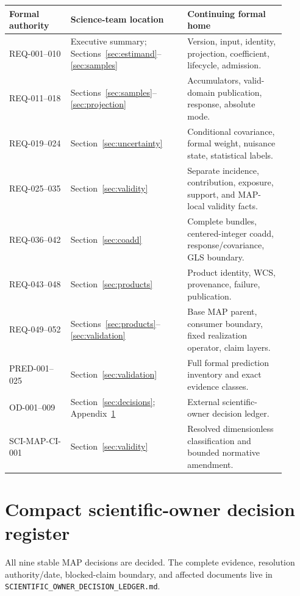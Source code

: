 \documentclass[10pt]{article}
\newcommand{\code}[1]{\nolinkurl{#1}}
\begin{document}
\begin{longtable}{L{0.20\linewidth}L{0.38\linewidth}L{0.32\linewidth}}
\toprule Formal authority & Science-team location & Continuing formal home \\
\midrule
REQ-001--010 & Executive summary; Sections~\ref{sec:estimand}--\ref{sec:samples} & Version, input, identity, projection, coefficient, lifecycle, admission.\\
REQ-011--018 & Sections~\ref{sec:samples}--\ref{sec:projection} & Accumulators, valid-domain publication, response, absolute mode.\\
REQ-019--024 & Section~\ref{sec:uncertainty} & Conditional covariance, formal weight, nuisance state, statistical labels.\\
REQ-025--035 & Section~\ref{sec:validity} & Separate incidence, contribution, exposure, support, and MAP-local validity facts.\\
REQ-036--042 & Section~\ref{sec:coadd} & Complete bundles, centered-integer coadd, response/covariance, GLS boundary.\\
REQ-043--048 & Section~\ref{sec:products} & Product identity, WCS, provenance, failure, publication.\\
REQ-049--052 & Sections~\ref{sec:products}--\ref{sec:validation} & Base MAP parent, consumer boundary, fixed realization operator, claim layers.\\
PRED-001--025 & Section~\ref{sec:validation} & Full formal prediction inventory and exact evidence classes.\\
OD-001--009 & Section~\ref{sec:decisions}; Appendix~\ref{app:decisions} & External scientific-owner decision ledger.\\
SCI-MAP-CI-001 & Section~\ref{sec:validity} & Resolved dimensionless classification and bounded normative amendment.\\
\bottomrule
\end{longtable}

\clearpage
\section{Compact scientific-owner decision register}\label{app:decisions}
All nine stable MAP decisions are decided. The complete evidence, resolution
authority/date, blocked-claim boundary, and affected documents live in
\code{SCIENTIFIC_OWNER_DECISION_LEDGER.md}.


\end{document}
